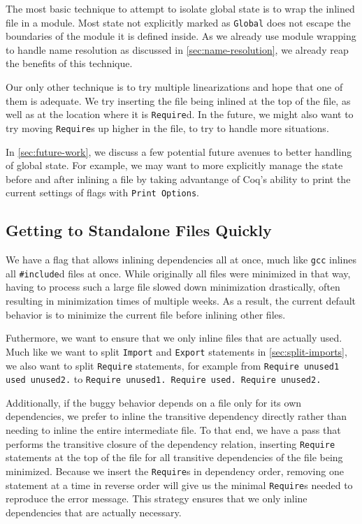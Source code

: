 \documentclass[a4paper,USenglish,cleveref,autoref,thm-restate]{lipics-v2021}
\begin{document}
The most basic technique to attempt to isolate global state is to wrap the inlined file in a module.
Most state not explicitly marked as \texttt{Global} does not escape the boundaries of the module it is defined inside.
As we already use module wrapping to handle name resolution as discussed in \autoref{sec:name-resolution}, we already reap the benefits of this technique.

Our only other technique is to try multiple linearizations and hope that one of them is adequate.
We try inserting the file being inlined at the top of the file, as well as at the location where it is \texttt{Require}d.
In the future, we might also want to try moving \texttt{Require}s up higher in the file, to try to handle more situations.

In \autoref{sec:future-work}, we discuss a few potential future avenues to better handling of global state.
For example, we may want to more explicitly manage the state before and after inlining a file by taking advantange of Coq's ability to print the current settings of flags with \texttt{Print Options}.

\subsection{Getting to Standalone Files Quickly}
We have a flag that allows inlining dependencies all at once, much like \texttt{gcc} inlines all \verb|#include|d files at once.
While originally all files were minimized in that way, having to process such a large file slowed down minimization drastically, often resulting in minimization times of multiple weeks.
As a result, the current default behavior is to minimize the current file before inlining other files.

Futhermore, we want to ensure that we only inline files that are actually used.
Much like we want to split \texttt{Import} and \verb|Export| statements in \autoref{sec:split-imports}, we also want to split \verb|Require| statements, for example from \texttt{Require unused1 used unused2.} to \texttt{Require unused1. Require used. Require unused2.}

Additionally, if the buggy behavior depends on a file only for its own dependencies, we prefer to inline the transitive dependency directly rather than needing to inline the entire intermediate file.
To that end, we have a pass that performs the transitive closure of the dependency relation, inserting \verb|Require| statements at the top of the file for all transitive dependencies of the file being minimized.
Because we insert the \verb|Require|s in dependency order, removing one statement at a time in reverse order will give us the minimal \verb|Require|s needed to reproduce the error message.
This strategy ensures that we only inline dependencies that are actually necessary.
\end{document}
